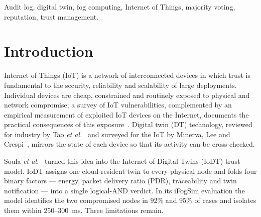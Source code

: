 \documentclass{ieeeaccess}
\begin{document}
\begin{keywords}
Audit log, digital twin, fog computing, Internet of Things, majority
voting, reputation, trust management.
\end{keywords}

\titlepgskip=-15pt

\maketitle

\section{Introduction}
\label{sec:intro}
 Internet of Things (IoT) is a network of
interconnected devices in which trust is fundamental to the security,
reliability and scalability of large deployments.  Individual devices
are cheap, constrained and routinely exposed to physical and network
compromise; a survey of IoT vulnerabilities, complemented by an
empirical measurement of exploited IoT devices on the Internet,
documents the practical consequences of this exposure~\cite{neshenko2019demystifying}.
Digital twin (DT) technology, reviewed for industry by Tao
\textit{et al.}~\cite{tao2019digital} and surveyed for the IoT by Minerva, Lee and
Crespi~\cite{minerva2020digital}, mirrors the state of each device so
that its activity can be cross-checked.

Soula \textit{et al.}~\cite{soula2024iodt} turned this idea into the
Internet of Digital Twins (IoDT) trust model.  IoDT assigns one
cloud-resident twin to every physical node and folds four binary
factors --- energy, packet delivery ratio (PDR), traceability and twin
notification --- into a single logical-AND verdict.  In its iFogSim
evaluation the model identifies the two compromised nodes in $92\%$
and $95\%$ of cases and isolates them within $250$--$300$~ms.  Three
limitations remain.
\end{document}
